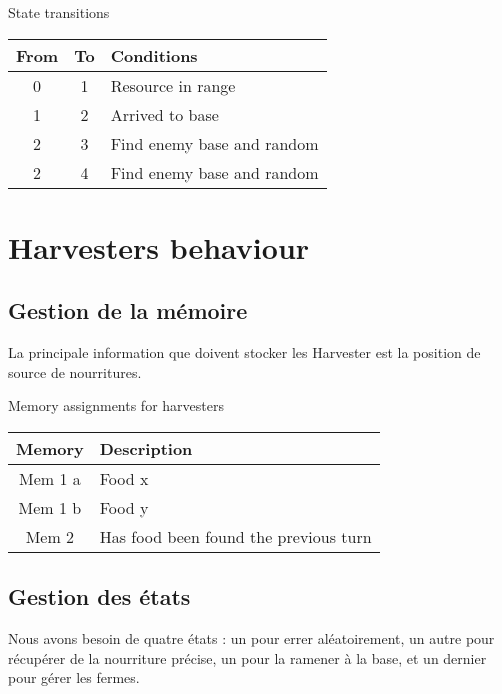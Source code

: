 \documentclass{article}
\begin{document}
\begin{table}[!htb]
	State transitions\\
	\begin{tabular}{|c|c|l|}
		\hline
		From & To & Conditions\\
		\hline
		0 & 1 & Resource in range\\
		\hline
		1 & 2 & Arrived to base\\
		\hline
		2 & 3 & Find enemy base and random\\
		\hline
		2 & 4 & Find enemy base and random\\
		\hline
	\end{tabular}
\end{table}

\section{Harvesters behaviour}


\subsection{Gestion de la mémoire}

La principale information que doivent stocker les Harvester est la position de source de nourritures.
\newline

\begin{table}[!htb]
	Memory assignments for harvesters\\
	\begin{tabular}{|c|l|}
		\hline
		Memory & Description\\
		\hline
		Mem 1 a & Food x\\
		Mem 1 b & Food y\\
		\hline
                Mem 2 & Has food been found the previous turn\\
                \hline
	\end{tabular}
\end{table}

\subsection{Gestion des états}

Nous avons besoin de quatre états : un pour errer aléatoirement, un autre pour récupérer de la nourriture précise, un pour la ramener à la base, et un dernier pour gérer les fermes.
\end{document}
